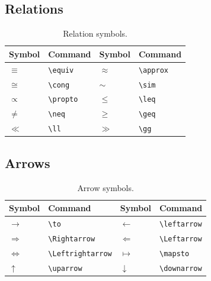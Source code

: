 \subsection{Relations}
\begin{table}[H]
	\centering
	\caption{Relation symbols.}
	\label{tab:symbols-relations}
	\begin{tabular}{@{}llll@{}}
		\toprule
		Symbol & Command & Symbol & Command \\
		\midrule
		$\equiv$  & \texttt{\textbackslash equiv}   & $\approx$ & \texttt{\textbackslash approx} \\
		$\cong$   & \texttt{\textbackslash cong}    & $\sim$    & \texttt{\textbackslash sim}    \\
		$\propto$ & \texttt{\textbackslash propto}  & $\leq$    & \texttt{\textbackslash leq}    \\
		$\neq$    & \texttt{\textbackslash neq}     & $\geq$    & \texttt{\textbackslash geq}    \\
		$\ll$     & \texttt{\textbackslash ll}      & $\gg$     & \texttt{\textbackslash gg}     \\
		\bottomrule
	\end{tabular}
\end{table}

\subsection{Arrows}
\begin{table}[H]
	\centering
	\caption{Arrow symbols.}
	\label{tab:symbols-arrows}
	\begin{tabular}{@{}llll@{}}
		\toprule
		Symbol & Command & Symbol & Command \\
		\midrule
		$\to$             & \texttt{\textbackslash to}             & $\leftarrow$      & \texttt{\textbackslash leftarrow}      \\
		$\Rightarrow$     & \texttt{\textbackslash Rightarrow}     & $\Leftarrow$      & \texttt{\textbackslash Leftarrow}      \\
		$\Leftrightarrow$ & \texttt{\textbackslash Leftrightarrow} & $\mapsto$         & \texttt{\textbackslash mapsto}         \\
		$\uparrow$        & \texttt{\textbackslash uparrow}        & $\downarrow$      & \texttt{\textbackslash downarrow}      \\
		\bottomrule
	\end{tabular}
\end{table}

